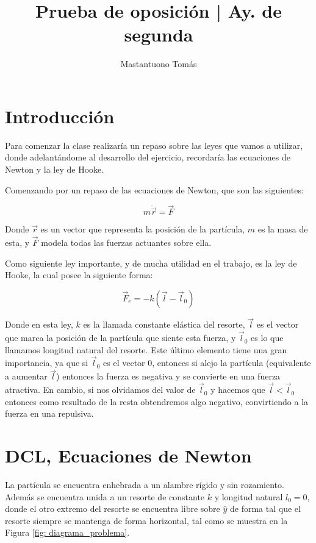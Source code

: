 \documentclass{article}
\author{Mastantuono Tomás}
\begin{document}
\title{Prueba de oposición | Ay. de segunda}
\date{}
\maketitle

\begin{multicols}{2}

    \section*{Introducción}
\label{introducción}

Para comenzar la clase realizaría un repaso sobre las leyes que vamos a utilizar, donde adelantándome al desarrollo del ejercicio, recordaría las ecuaciones de Newton y la ley de Hooke.

Comenzando por un repaso de las ecuaciones de Newton, que son las siguientes:

\begin{equation}
    m\ddot{\vec{r}} = \vec{F}
\end{equation}

Donde $\vec{r}$ es un vector que representa la posición de la partícula, $m$ es la masa de esta, y $\vec{F}$ modela todas las fuerzas actuantes sobre ella.

Como siguiente ley importante, y de mucha utilidad en el trabajo, es la ley de Hooke, la cual posee la siguiente forma:

\begin{equation}
    \vec{F}_e = -k(\vec{l} - \vec{l}_0)
\end{equation}

Donde en esta ley, $k$ es la llamada constante elástica del resorte, $\vec{l}$ es el vector que marca la posición de la partícula que siente esta fuerza, y $\vec{l}_0$ es lo que llamamos longitud natural del resorte. Este último elemento tiene una gran importancia, ya que si $\vec{l}_0$ es el vector $0$, entonces si alejo la partícula (equivalente a aumentar $\vec{l}$) entonces la fuerza es negativa y se convierte en una fuerza atractiva. En cambio, si nos olvidamos del valor de $\vec{l}_0$ y hacemos que $\vec{l} < \vec{l}_0$ entonces como resultado de la resta obtendremos algo negativo, convirtiendo a la fuerza en una repulsiva.

\section{DCL, Ecuaciones de Newton}
La partícula se encuentra enhebrada a un alambre rígido y sin rozamiento. Además se encuentra unida a un resorte de constante $k$ y longitud natural $l_0 = 0$, donde el otro extremo del resorte se encuentra libre sobre $\hat{y}$ de forma tal que el resorte siempre se mantenga de forma horizontal, tal como se muestra en la Figura \ref{fig: diagrama_problema}.


\end{multicols}
\end{document}
